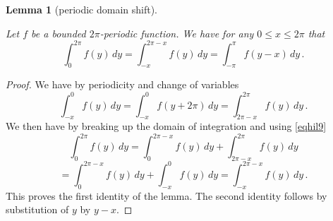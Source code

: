 \documentclass[10pt,a4paper]{article}
\theoremstyle{plain}
\newtheorem{lemma}[theorem]{Lemma}
\theoremstyle{definition}
\numberwithin{equation}{subsection}
\newcommand{\lean}[1]{}
\newcommand{\leanok}{}
\begin{document}
\begin{lemma}[periodic domain shift]\label{periodic-domain-shift}
\leanok
\lean{Function.Periodic.intervalIntegral_add_eq, intervalIntegral.integral_comp_sub_right}
Let $f$ be a bounded $2\pi$-periodic function. We have for any
$0 \le x\le 2\pi$ that
\begin{equation}
 \int_0^{2\pi} f(y)\, dy= \int_{-x}^{2\pi -x} f(y)\, dy
 =\int_{-\pi}^{\pi} f(y-x)\, dy\,.
\end{equation}
\end{lemma}
\begin{proof}
\leanok
    We have by periodicity and change of variables
    \begin{equation}\label{eqhil9}
 \int_{-x}^{0} f(y)\, dy=\int_{-x}^{0} f(y+2\pi)\, dy= \int_{2\pi -x}^{2\pi} f(y)\, dy\, .
\end{equation}
We then have by breaking up the domain of integration
and using \eqref{eqhil9}
\begin{equation*}
 \int_0^{2\pi} f(y)\, dy= \int_0^{2\pi -x} f(y)\, dy+
 \int_{2\pi -x}^{2\pi} f(y)\, dy
 \end{equation*}
\begin{equation}
= \int_0^{2\pi -x} f(y)\, dy+
 \int_{ -x}^{0} f(y)\, dy
 = \int_{-x}^{2\pi-x} f(y)\, dy\, .
 \end{equation}
This proves the first identity of the lemma. The second identity follows by substitution of $y$ by $y-x$.
\end{proof}
\end{document}
